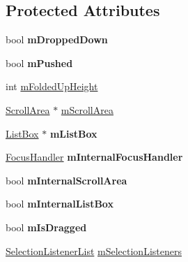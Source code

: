 \subsection*{Protected Attributes}
\begin{DoxyCompactItemize}
\item 
bool {\bfseries m\+Dropped\+Down}\hypertarget{classgcn_1_1DropDown_a6044d9242a012940b40f82aca990f1b1}{}\label{classgcn_1_1DropDown_a6044d9242a012940b40f82aca990f1b1}

\item 
bool {\bfseries m\+Pushed}\hypertarget{classgcn_1_1DropDown_af2be6c53414e75bed1f7c26a04c162cd}{}\label{classgcn_1_1DropDown_af2be6c53414e75bed1f7c26a04c162cd}

\item 
int \hyperlink{classgcn_1_1DropDown_a19582187e93e0c963ce131e4dda76ed0}{m\+Folded\+Up\+Height}
\item 
\hyperlink{classgcn_1_1ScrollArea}{Scroll\+Area} $\ast$ \hyperlink{classgcn_1_1DropDown_ad993ee12246ec45ae933dc0b69120858}{m\+Scroll\+Area}
\item 
\hyperlink{classgcn_1_1ListBox}{List\+Box} $\ast$ {\bfseries m\+List\+Box}\hypertarget{classgcn_1_1DropDown_a1931b17ba473552e48df708af1e4981b}{}\label{classgcn_1_1DropDown_a1931b17ba473552e48df708af1e4981b}

\item 
\hyperlink{classgcn_1_1FocusHandler}{Focus\+Handler} {\bfseries m\+Internal\+Focus\+Handler}\hypertarget{classgcn_1_1DropDown_a53e3e591e6d368f4a51f8879d4f56873}{}\label{classgcn_1_1DropDown_a53e3e591e6d368f4a51f8879d4f56873}

\item 
bool {\bfseries m\+Internal\+Scroll\+Area}\hypertarget{classgcn_1_1DropDown_afa6235ad0b7181c6d6e6c0f20de2df3d}{}\label{classgcn_1_1DropDown_afa6235ad0b7181c6d6e6c0f20de2df3d}

\item 
bool {\bfseries m\+Internal\+List\+Box}\hypertarget{classgcn_1_1DropDown_ab77b80e2db20ca032c2e51fec24929b9}{}\label{classgcn_1_1DropDown_ab77b80e2db20ca032c2e51fec24929b9}

\item 
bool {\bfseries m\+Is\+Dragged}\hypertarget{classgcn_1_1DropDown_a1360f37268fac8557b8711d299315e84}{}\label{classgcn_1_1DropDown_a1360f37268fac8557b8711d299315e84}

\item 
\hyperlink{classgcn_1_1DropDown_a04c257fcc8360fdff851c66a8ada149e}{Selection\+Listener\+List} \hyperlink{classgcn_1_1DropDown_af75c84f875796ada546de4ee008f165e}{m\+Selection\+Listeners}
\end{DoxyCompactItemize}
